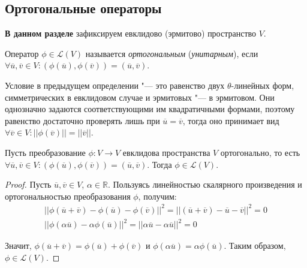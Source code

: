\subsection{Ортогональные операторы}

\textbf{В данном разделе} зафиксируем евклидово (эрмитово) пространство $V$.

\begin{definition}
	Оператор $\phi \in \mathcal{L}(V)$ называется \textit{ортогональным} (\textit{унитарным}), если $\forall \overline{u}, \overline{v} \in V: (\phi(\overline{u}), \phi(\overline{v})) = (\overline{u}, \overline{v})$.
\end{definition}

\begin{note}
	Условие в предыдущем определении "--- это равенство двух $\theta$-линейных форм, симметрических в евклидовом случае и эрмитовых "--- в эрмитовом. Они однозначно задаются соответствующими им квадратичными формами, поэтому равенство достаточно проверять лишь при $\overline{u} = \overline{v}$, тогда оно принимает вид $\forall \overline{v} \in V: ||\phi(\overline{v})|| = ||\overline{v}||$.
\end{note}

\begin{proposition}
	Пусть преобразование $\phi: V \rightarrow V$ евклидова пространства $V$ ортогонально, то есть $\forall \overline{u}, \overline{v} \in V: (\phi(\overline{u}), \phi(\overline{v})) = (\overline{u}, \overline{v})$. Тогда $\phi \in \mathcal{L}(V)$.
\end{proposition}

\begin{proof}
	Пусть $\overline{u}, \overline{v} \in V$, $\alpha \in \mathbb{R}$. Пользуясь линейностью скалярного произведения и ортогональностью преобразования $\phi$, получим:
	\begin{gather*}
		||\phi(\overline{u} + \overline{v}) - \phi(\overline{u}) - \phi(\overline{v})||^2 = ||(\overline{u} + \overline{v}) - \overline{u} - \overline{v}||^2 = 0\\
		||\phi(\alpha\overline{u}) -\alpha\phi(\overline{u})||^2 = ||\alpha\overline{u} - \alpha\overline{u}||^2 = 0
	\end{gather*}
	
	Значит, $\phi(\overline{u} + \overline{v}) = \phi(\overline{u}) + \phi(\overline{v})$ и $\phi(\alpha\overline{u}) = \alpha\phi(\overline{u})$. Таким образом, $\phi \in \mathcal{L}(V)$.
\end{proof}

